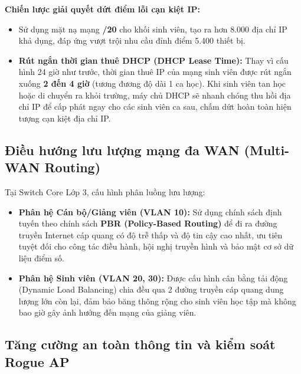 \textbf{Chiến lược giải quyết dứt điểm lỗi cạn kiệt IP:}
\begin{itemize}
    \item Sử dụng mặt nạ mạng \textbf{/20} cho khối sinh viên, tạo ra hơn 8.000 địa chỉ IP khả dụng, đáp ứng vượt trội nhu cầu đỉnh điểm 5.400 thiết bị.
    \item \textbf{Rút ngắn thời gian thuê DHCP (DHCP Lease Time):} Thay vì cấu hình 24 giờ như trước, thời gian thuê IP của mạng sinh viên được rút ngắn xuống \textbf{2 đến 4 giờ} (tương đương độ dài 1 ca học). Khi sinh viên tan học hoặc di chuyển ra khỏi trường, máy chủ DHCP sẽ nhanh chóng thu hồi địa chỉ IP để cấp phát ngay cho các sinh viên ca sau, chấm dứt hoàn toàn hiện tượng cạn kiệt địa chỉ IP.
\end{itemize}

\subsection{Điều hướng lưu lượng mạng đa WAN (Multi-WAN Routing)}

Tại Switch Core Lớp 3, cấu hình phân luồng lưu lượng:
\begin{itemize}
    \item \textbf{Phân hệ Cán bộ/Giảng viên (VLAN 10):} Sử dụng chính sách định tuyến theo chính sách \textbf{PBR (Policy-Based Routing)} để đi ra đường truyền Internet cáp quang có độ trễ thấp và độ tin cậy cao nhất, ưu tiên tuyệt đối cho công tác điều hành, hội nghị truyền hình và bảo mật cơ sở dữ liệu điểm số.
    \item \textbf{Phân hệ Sinh viên (VLAN 20, 30):} Được cấu hình cân bằng tải động (Dynamic Load Balancing) chia đều qua 2 đường truyền cáp quang dung lượng lớn còn lại, đảm bảo băng thông rộng cho sinh viên học tập mà không bao giờ gây ảnh hưởng đến mạng của giảng viên.
\end{itemize}

\subsection{Tăng cường an toàn thông tin và kiểm soát Rogue AP}

